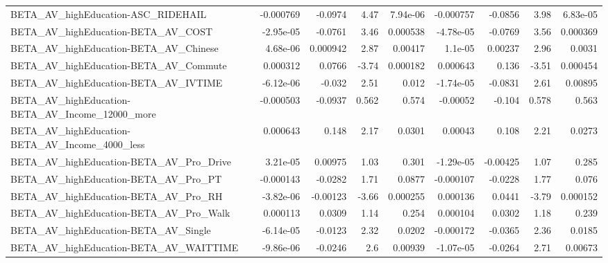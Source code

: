 \begin{tabular}{lrrrrrrrr}
BETA\_AV\_highEducation-ASC\_RIDEHAIL                 &   -0.000769 &      -0.0974 &      4.47 & 7.94e-06 &  -0.000757 &     -0.0856 &         3.98 &      6.83e-05 \\
BETA\_AV\_highEducation-BETA\_AV\_COST                 &   -2.95e-05 &      -0.0761 &      3.46 & 0.000538 &  -4.78e-05 &     -0.0769 &         3.56 &      0.000369 \\
BETA\_AV\_highEducation-BETA\_AV\_Chinese              &    4.68e-06 &     0.000942 &      2.87 &  0.00417 &    1.1e-05 &     0.00237 &         2.96 &        0.0031 \\
BETA\_AV\_highEducation-BETA\_AV\_Commute              &    0.000312 &       0.0766 &     -3.74 & 0.000182 &   0.000643 &       0.136 &        -3.51 &      0.000454 \\
BETA\_AV\_highEducation-BETA\_AV\_IVTIME               &   -6.12e-06 &       -0.032 &      2.51 &    0.012 &  -1.74e-05 &     -0.0831 &         2.61 &       0.00895 \\
BETA\_AV\_highEducation-BETA\_AV\_Income\_12000\_more    &   -0.000503 &      -0.0937 &     0.562 &    0.574 &   -0.00052 &      -0.104 &        0.578 &         0.563 \\
BETA\_AV\_highEducation-BETA\_AV\_Income\_4000\_less     &    0.000643 &        0.148 &      2.17 &   0.0301 &    0.00043 &       0.108 &         2.21 &        0.0273 \\
BETA\_AV\_highEducation-BETA\_AV\_Pro\_Drive            &    3.21e-05 &      0.00975 &      1.03 &    0.301 &  -1.29e-05 &    -0.00425 &         1.07 &         0.285 \\
BETA\_AV\_highEducation-BETA\_AV\_Pro\_PT               &   -0.000143 &      -0.0282 &      1.71 &   0.0877 &  -0.000107 &     -0.0228 &         1.77 &         0.076 \\
BETA\_AV\_highEducation-BETA\_AV\_Pro\_RH               &   -3.82e-06 &     -0.00123 &     -3.66 & 0.000255 &   0.000136 &      0.0441 &        -3.79 &      0.000152 \\
BETA\_AV\_highEducation-BETA\_AV\_Pro\_Walk             &    0.000113 &       0.0309 &      1.14 &    0.254 &   0.000104 &      0.0302 &         1.18 &         0.239 \\
BETA\_AV\_highEducation-BETA\_AV\_Single               &   -6.14e-05 &      -0.0123 &      2.32 &   0.0202 &  -0.000172 &     -0.0365 &         2.36 &        0.0185 \\
BETA\_AV\_highEducation-BETA\_AV\_WAITTIME             &   -9.86e-06 &      -0.0246 &       2.6 &  0.00939 &  -1.07e-05 &     -0.0264 &         2.71 &       0.00673 \\

\end{tabular}
